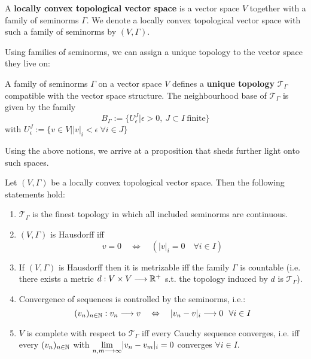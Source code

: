 \begin{definition}
\label{def:Locally_convex}
  A \textbf{locally convex topological vector space} is a vector space $V$ together with a family of seminorms $\Gamma$. We denote a locally convex topological vector space with such a family of seminorms by $(V, \Gamma)$.
\end{definition}

Using families of seminorms, we can assign a unique topology to the vector space they live on:

\begin{definition}
  A family of seminorms $\Gamma$ on a vector space $V$ defines a \textbf{unique topology} $\mathcal{T}_\Gamma$ compatible with the vector space structure. The neighbourhood base of $\mathcal{T}_\Gamma$ is given by the family
  $$ B_\Gamma := \{ U^J_\epsilon | \epsilon > 0, \ J \subset I \ \text{finite} \} $$
  with $U^J_\epsilon := \{ v \in V \big| |v|_i < \epsilon \ \forall i \in J \}$
\end{definition}

Using the above notions, we arrive at a proposition that sheds further light onto such spaces.

\begin{prop}
  Let $(V,\Gamma)$ be a locally convex topological vector space. Then the following statements hold:
  \begin{enumerate}
    \item $\mathcal{T}_\Gamma$ is the finest topology in which all included seminorms are continuous.

    \item $(V, \Gamma)$ is Hausdorff iff
    $$ v = 0 \quad \Leftrightarrow \quad \left( |v|_i = 0 \quad \forall i \in I\right)$$

    \item If $(V, \Gamma)$ is Hausdorff then it is metrizable iff the family $\Gamma$ is countable (i.e. there exists a metric $d:V\times V \longrightarrow \mathbb{R}^+$ s.t. the topology induced by $d$ is $\mathcal{T}_\Gamma$).

    \item Convergence of sequences is controlled by the seminorms, i.e.:
    $$ (v_n)_{n\in\mathbb{N}} : v_n \longrightarrow v \quad \Leftrightarrow \quad |v_n - v|_i \longrightarrow 0 \ \ \forall i \in I $$

    \item $V$ is complete with respect to $\mathcal{T}_\Gamma$ iff every Cauchy sequence converges, i.e. iff every $(v_n)_{n\in\mathbb{N}}$ with $\underset{n,m \longrightarrow \infty}{\lim} |v_n - v_m|_i = 0$ converges $\forall i \in I$.
  \end{enumerate}
\end{prop}

